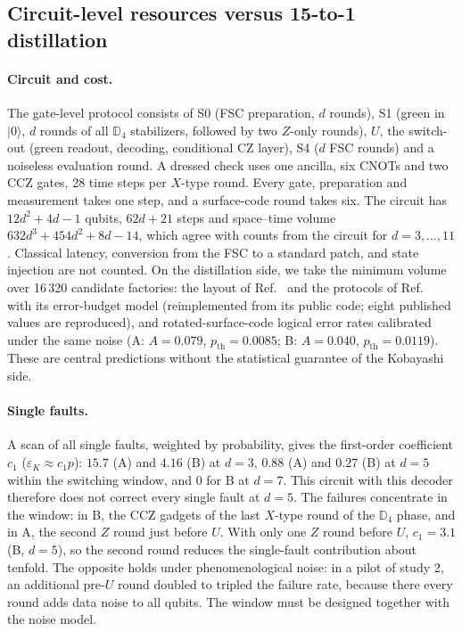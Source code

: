 \documentclass[a4paper]{article}
\providecommand{\ket}[1]{\ensuremath{|#1\rangle}}
\newcommand{\epsK}{\varepsilon_K}
\begin{document}
\subsection{Circuit-level resources versus 15-to-1 distillation}
\label{sec:res3}

\paragraph{Circuit and cost.}
The gate-level protocol consists of S0 (FSC preparation, $d$ rounds), S1 (green in $\ket0$, $d$ rounds of all $\mathbb{D}_4$ stabilizers, followed by two $Z$-only rounds), $U$, the switch-out (green readout, decoding, conditional CZ layer), S4 ($d$ FSC rounds) and a noiseless evaluation round. A dressed check uses one ancilla, six CNOTs and two CCZ gates, 28 time steps per $X$-type round. Every gate, preparation and measurement takes one step, and a surface-code round takes six. The circuit has $12d^2+4d-1$ qubits, $62d+21$ steps and space--time volume $632d^3+454d^2+8d-14$, which agree with counts from the circuit for $d=3,\dots,11$. Classical latency, conversion from the FSC to a standard patch, and state injection are not counted. On the distillation side, we take the minimum volume over 16\,320 candidate factories: the layout of Ref.~\cite{litinski2019game} and the protocols of Ref.~\cite{litinski2019magic} with its error-budget model (reimplemented from its public code; eight published values are reproduced), and rotated-surface-code logical error rates calibrated under the same noise (A: $A=0.079$, $p_{\mathrm{th}}=0.0085$; B: $A=0.040$, $p_{\mathrm{th}}=0.0119$). These are central predictions without the statistical guarantee of the Kobayashi side.

\paragraph{Single faults.}
A scan of all single faults, weighted by probability, gives the first-order coefficient $c_1$ ($\epsK\approx c_1p$): $15.7$ (A) and $4.16$ (B) at $d=3$, $0.88$ (A) and $0.27$ (B) at $d=5$ within the switching window, and $0$ for B at $d=7$. This circuit with this decoder therefore does not correct every single fault at $d=5$. The failures concentrate in the window: in B, the CCZ gadgets of the last $X$-type round of the $\mathbb{D}_4$ phase, and in A, the second $Z$ round just before $U$. With only one $Z$ round before $U$, $c_1=3.1$ (B, $d=5$), so the second round reduces the single-fault contribution about tenfold. The opposite holds under phenomenological noise: in a pilot of study 2, an additional pre-$U$ round doubled to tripled the failure rate, because there every round adds data noise to all qubits. The window must be designed together with the noise model.
\end{document}
